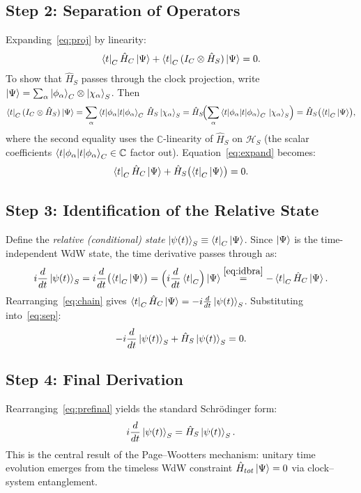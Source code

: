 \documentclass[11pt,a4paper]{article}
\theoremstyle{definition}
\theoremstyle{remark}
\begin{document}
\subsection*{Step 2: Separation of Operators}
Expanding~\eqref{eq:proj} by linearity:
\begin{equation}\label{eq:expand}
  \bra{t}_C\hat{H}_C\ket{\Psi}+\bra{t}_C(I_C\otimes\hat{H}_S)\ket{\Psi}=0.
\end{equation}
To show that $\hat{H}_S$ passes through the clock projection, write
$\ket{\Psi}=\sum_\alpha\ket{\phi_\alpha}_C\otimes\ket{\chi_\alpha}_S$.  Then
\[
  \bra{t}_C(I_C\otimes\hat{H}_S)\ket{\Psi}
    = \sum_\alpha\braket{t|\phi_\alpha}_C\,\hat{H}_S\ket{\chi_\alpha}_S
    = \hat{H}_S\!\Bigl(\sum_\alpha\braket{t|\phi_\alpha}_C\,\ket{\chi_\alpha}_S\Bigr)
    = \hat{H}_S\bigl(\bra{t}_C\ket{\Psi}\bigr),
\]
where the second equality uses the $\mathbb{C}$-linearity of $\hat{H}_S$ on $\mathcal{H}_S$
(the scalar coefficients $\braket{t|\phi_\alpha}_C\in\mathbb{C}$ factor out).
Equation~\eqref{eq:expand} becomes:
\begin{equation}\label{eq:sep}
  \bra{t}_C\hat{H}_C\ket{\Psi}+\hat{H}_S\bigl(\bra{t}_C\ket{\Psi}\bigr)=0.
\end{equation}

\subsection*{Step 3: Identification of the Relative State}
Define the \emph{relative (conditional) state} $\ket{\psi(t)}_S\equiv\bra{t}_C\ket{\Psi}$.
Since $\ket{\Psi}$ is the time-independent WdW state, the time derivative passes through as:
\begin{equation}\label{eq:chain}
  i\frac{d}{dt}\ket{\psi(t)}_S
    = i\frac{d}{dt}\bigl(\bra{t}_C\ket{\Psi}\bigr)
    = \Bigl(i\frac{d}{dt}\bra{t}_C\Bigr)\ket{\Psi}
    \stackrel{\eqref{eq:idbra}}{=} -\bra{t}_C\hat{H}_C\ket{\Psi}.
\end{equation}
Rearranging~\eqref{eq:chain} gives $\bra{t}_C\hat{H}_C\ket{\Psi}=-i\tfrac{d}{dt}\ket{\psi(t)}_S$.
Substituting into~\eqref{eq:sep}:
\begin{equation}\label{eq:prefinal}
  -i\frac{d}{dt}\ket{\psi(t)}_S+\hat{H}_S\ket{\psi(t)}_S=0.
\end{equation}

\subsection*{Step 4: Final Derivation}
Rearranging~\eqref{eq:prefinal} yields the standard Schr\"odinger form:
\begin{equation}\label{eq:schrodinger}
  i\frac{d}{dt}\ket{\psi(t)}_S = \hat{H}_S\ket{\psi(t)}_S.
\end{equation}
This is the central result of the Page--Wootters mechanism: unitary time evolution
emerges from the timeless WdW constraint $\hat{H}_{tot}\ket{\Psi}=0$ via
clock--system entanglement.
\end{document}
